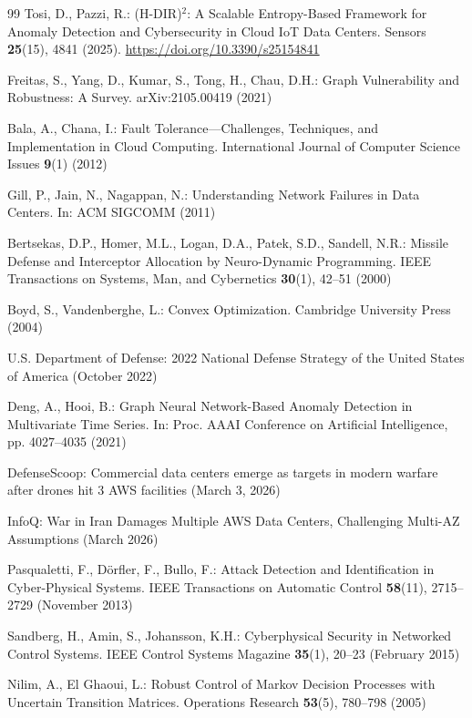 \documentclass[runningheads]{llncs}
\begin{document}
\begin{thebibliography}{99}
 Tosi, D., Pazzi, R.: (H-DIR)$^2$: A Scalable Entropy-Based Framework for Anomaly Detection and Cybersecurity in Cloud IoT Data Centers. Sensors \textbf{25}(15), 4841 (2025). \url{https://doi.org/10.3390/s25154841}

 Freitas, S., Yang, D., Kumar, S., Tong, H., Chau, D.H.: Graph Vulnerability and Robustness: A Survey. arXiv:2105.00419 (2021)

 Bala, A., Chana, I.: Fault Tolerance---Challenges, Techniques, and Implementation in Cloud Computing. International Journal of Computer Science Issues \textbf{9}(1) (2012)

 Gill, P., Jain, N., Nagappan, N.: Understanding Network Failures in Data Centers. In: ACM SIGCOMM (2011)

 Bertsekas, D.P., Homer, M.L., Logan, D.A., Patek, S.D., Sandell, N.R.: Missile Defense and Interceptor Allocation by Neuro-Dynamic Programming. IEEE Transactions on Systems, Man, and Cybernetics \textbf{30}(1), 42--51 (2000)

 Boyd, S., Vandenberghe, L.: Convex Optimization. Cambridge University Press (2004)

 U.S. Department of Defense: 2022 National Defense Strategy of the United States of America (October 2022)

 Deng, A., Hooi, B.: Graph Neural Network-Based Anomaly Detection in Multivariate Time Series. In: Proc. AAAI Conference on Artificial Intelligence, pp. 4027--4035 (2021)

 DefenseScoop: Commercial data centers emerge as targets in modern warfare after drones hit 3 AWS facilities (March 3, 2026)

 InfoQ: War in Iran Damages Multiple AWS Data Centers, Challenging Multi-AZ Assumptions (March 2026)

 Pasqualetti, F., D\"{o}rfler, F., Bullo, F.: Attack Detection and Identification in Cyber-Physical Systems. IEEE Transactions on Automatic Control \textbf{58}(11), 2715--2729 (November 2013)

 Sandberg, H., Amin, S., Johansson, K.H.: Cyberphysical Security in Networked Control Systems. IEEE Control Systems Magazine \textbf{35}(1), 20--23 (February 2015)

 Nilim, A., El Ghaoui, L.: Robust Control of Markov Decision Processes with Uncertain Transition Matrices. Operations Research \textbf{53}(5), 780--798 (2005)


\end{thebibliography}
\end{document}
